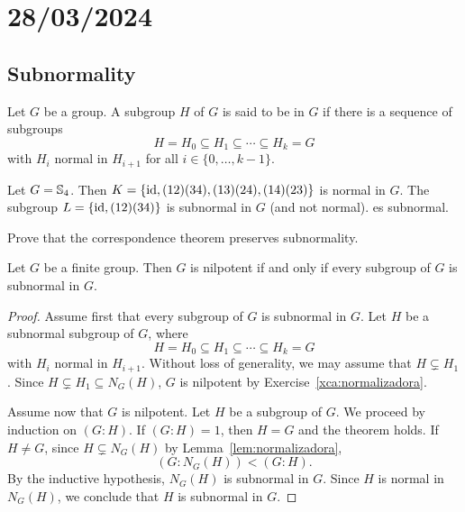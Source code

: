 \section{28/03/2024}

\subsection{Subnormality}

\begin{definition}
	Let $G$ be a group. A subgroup $H$ of $G$ is said to be  in $G$ if there is a sequence 
    of subgroups 
	\[
		H=H_0\subseteq H_1\subseteq\cdots\subseteq H_k=G		
	\]
	with $H_i$ normal in $H_{i+1}$ for all $i\in\{0,\dots,k-1\}$. 
\end{definition}

\begin{example}
	Let $G=\mathbb{S}_4$. Then $K=\{\operatorname{id},(12)(34),(13)(24),(14)(23)\}$ is normal in $G$. 
	The subgroup $L=\{\operatorname{id},(12)(34)\}$ is subnormal in $G$ (and not normal). 
	es subnormal. 
\end{example}

\begin{exercise}
\label{xca:correspondence_subnormality}
    Prove that the correspondence theorem preserves subnormality. 
\end{exercise}

\begin{theorem}
	\label{thm:subnormal}
	Let $G$ be a finite group. Then $G$ is nilpotent if and only if every subgroup of $G$ is subnormal in $G$. 
\end{theorem}

\begin{proof}
	Assume first that every subgroup of $G$ is subnormal in $G$. Let $H$ be a subnormal subgroup of $G$, where 
	\[
		H=H_0\subseteq H_1\subseteq\cdots\subseteq H_k=G
	\]
	with $H_i$ normal in $H_{i+1}$. Without loss of generality, we may assume that 
	$H\subsetneq H_1$. Since $H\subsetneq H_1\subseteq N_G(H)$, 
	$G$ is nilpotent by Exercise~\ref{xca:normalizadora}.

	Assume now that $G$ is nilpotent. Let $H$ be a subgroup of $G$.
	We proceed by induction on $(G:H)$. If $(G:H)=1$, then $H=G$ and the theorem holds. If 
	$H\ne G$, since $H\subsetneq N_G(H)$ by Lemma~\ref{lem:normalizadora}, 
	\[
		(G:N_G(H))<(G:H).
	\]
	By the inductive hypothesis, $N_G(H)$ is subnormal in $G$. Since $H$ is 
	normal in $N_G(H)$, we conclude that $H$ is subnormal in $G$.
\end{proof}

